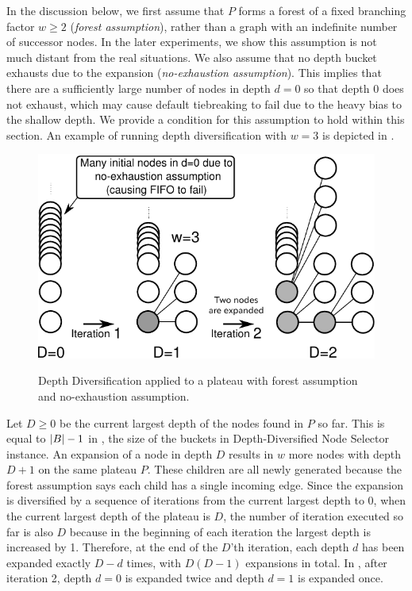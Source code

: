 % 
In the discussion below, 
we first assume that $P$ forms a forest of a fixed branching factor
$w\geq 2$ (\emph{forest assumption}), rather than a graph with an indefinite number of successor nodes.
In the later experiments, we show this assumption is not much distant from the real situations.
We also assume that no depth bucket exhausts due to the expansion (\emph{no-exhaustion assumption}). This implies that there are a sufficiently large number of nodes in depth $d=0$ so that depth 0 does not exhaust, which may cause \fifo default tiebreaking to fail due to the heavy bias to the shallow depth.
We provide a condition for this assumption to hold within this section.
An example of running depth diversification with $w=3$ is depicted in .

\begin{figure}[htbp]
  \centering
  \includegraphics{img/depth-distribution-analysis.pdf}
 \label{fig:depth-distribution-analysis}
 \caption{Depth Diversification applied to a plateau 
with forest assumption and no-exhaustion assumption.}
\end{figure}

Let $D\geq 0$ be the current largest depth of the nodes found in $P$ so far.
This is equal to ${\left|B\right|}-1$ in ,
the size of the buckets in Depth-Diversified Node Selector instance.
An expansion of a node in depth $D$ results in $w$ more nodes with depth $D+1$ on the same plateau $P$.
These children are all newly generated because the forest assumption says each child has a single incoming edge.
Since the expansion is
diversified by a sequence of iterations from the current largest depth to 0, when the current
largest depth of the plateau is $D$, the number of iteration executed so far is also $D$ because
in the beginning of each iteration the largest depth is increased by 1.
Therefore, at the end of the $D$'th iteration,
each depth $d$ has been expanded exactly $D-d$ times, with $D(D-1)$ expansions in total.
In ,
after iteration 2, depth $d=0$ is expanded twice and depth $d=1$ is expanded once.

